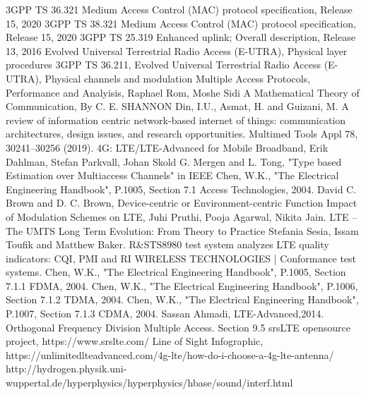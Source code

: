 \begin{thebibliography}{9}
3GPP TS 36.321 Medium Access Control (MAC) protocol specification, Release 15, 2020
3GPP TS 38.321 Medium Access Control (MAC) protocol specification, Release 15, 2020
3GPP TS 25.319 Enhanced uplink; Overall description, Release 13, 2016
Evolved Universal Terrestrial Radio Access (E-UTRA), Physical layer procedures 
3GPP TS 36.211, Evolved Universal Terrestrial Radio Access (E-UTRA), Physical channels and modulation
Multiple Access Protocols, Performance and Analyisis, Raphael Rom, Moshe Sidi 
A Mathematical Theory of Communication, By C. E. SHANNON
Din, I.U., Asmat, H. and Guizani, M. A review of information centric network-based internet of things: communication architectures, design issues, and research opportunities. Multimed Tools Appl 78, 30241–30256 (2019). 
4G: LTE/LTE-Advanced for Mobile Broadband, Erik Dahlman, Stefan Parkvall, Johan Skold
G. Mergen and L. Tong, "Type based Estimation over Multiaccess Channels" in IEEE 
Chen, W.K., "The Electrical Engineering Handbook", P.1005, Section 7.1 Access Technologies, 2004.
David C. Brown and D. C. Brown, Device-centric or Environment-centric Function
Impact of Modulation Schemes on LTE, Juhi Pruthi, Pooja Agarwal, Nikita Jain.
LTE – The UMTS Long Term Evolution: From Theory to Practice Stefania Sesia, Issam Toufik and Matthew Baker.
R\&STS8980 test system analyzes LTE quality indicators: CQI, PMI and RI
WIRELESS TECHNOLOGIES | Conformance test systems. 
Chen, W.K., "The Electrical Engineering Handbook", P.1005, Section 7.1.1 FDMA, 2004. 
Chen, W.K., "The Electrical Engineering Handbook", P.1006, Section 7.1.2 TDMA, 2004.
Chen, W.K., "The Electrical Engineering Handbook", P.1007, Section 7.1.3 CDMA, 2004.
Sassan Ahmadi, LTE-Advanced,2014. Orthogonal Frequency Division Multiple Access. Section 9.5
srsLTE opensource project, https://www.srslte.com/ 
Line of Sight Infographic, https://unlimitedlteadvanced.com/4g-lte/how-do-i-choose-a-4g-lte-antenna/
http://hydrogen.physik.uni-wuppertal.de/hyperphysics/hyperphysics/hbase/sound/interf.html
\end{thebibliography}
